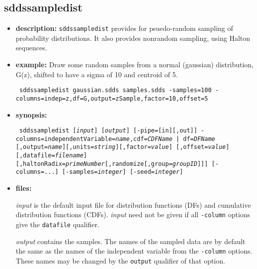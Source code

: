 \newpage
\subsection{sddssampledist}
\label{sddssampledist}

\begin{itemize}
\item {\bf description:}
{\tt sddssampledist} provides for psuedo-random sampling of probability
distributions.  It also provides nonrandom sampling, using Halton sequences.

\item {\bf example:} 
Draw some random samples from a normal (gaussian) distribution, G(z), shifted to have
a sigma of 10 and centroid of 5.
\begin{flushleft}{\tt
sddssampledist gaussian.sdds samples.sdds -samples=100 -columns=indep=z,df=G,output=zSample,factor=10,offset=5
}\end{flushleft}

\item {\bf synopsis:} 
\begin{flushleft}{\tt
sddssampledist [{\em input}] [{\em output}] [-pipe=[in][,out]]
-columns=independentVariable={\em name},{cdf={\em CDFName} | df={\em DFName}}
   [,output={\em name}][,units={\em string}][,factor={\em value}]
   [,offset={\em value}][,datafile={\em filename}]
   [,haltonRadix={\em primeNumber}[,randomize[,group={\em groupID}]]]
[-columns=...] [-samples={\em integer}] [-seed={\em integer}]
}\end{flushleft}

\item {\bf files:}

{\em input} is the default input file for distribution functions (DFs)
and cumulative distribution functions (CDFs).  {\em input} need not be
given if all {\tt -column} options give the {\tt datafile} qualifier.

{\em output} contains the samples.  The names of the sampled data are
by default the same as the names of the independent variable from the
{\tt -column} options.  These names may be changed by the {\tt output}
qualifier of that option.


\end{itemize}
